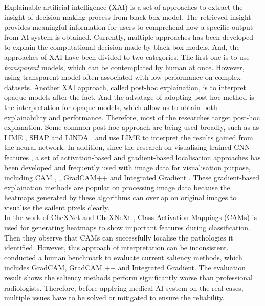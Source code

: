 Explainable artificial intelligence (XAI) is a set of approaches to extract the insight of decision making process from black-box model. The retrieved insight provides meaningful information for users to comprehend how a specific output from AI system is obtained. Currently, multiple approaches has been developed to explain the computational decision made by black-box models. And, the approaches of XAI have been divided to two categories. The first one is to use \textit{transparent} models, which can be contemplated by human at once. However, using transparent model often associated with low performance on complex datasets. Another XAI approach, called post-hoc explaination, is to interpret opaque models after-the-fact. And the advatage of adopting post-hoc method is the interpretation for opaque models, which allow us to obtain both explainability and performance. Therefore, most of the researches target post-hoc explanation. Some common post-hoc approach are being used broadly, such as as LIME \citep{Ribeiro2016LIME}, SHAP \citep{Lundberg2017SHAP} and LINDA \citep{Moreira2021LINDA}. \citet{Ahsan2020LIMEOnCXR} and \citet{Teixeira2021LIMEAndGradCAMOnCXR} use LIME to interpret the results gained from the neural network. In addition, since the research on visualising trained CNN features \citep{Zeiler2014UnderstandCNN} \citep{Simonyan14DeepInside}, a set of activation-based and gradient-based localisation approaches has been developed and frequently used with image data for visualisation purpose, including CAM \citep{Zhou2015CAM}, \citep{Selvaraju2017GradCAM}, GradCAM++ \citep{Chattopadhay2018GradCAM++} and Integrated Gradient \citep{Sundararajan2017IntegratedGradient}. These gradient-based explaination methods are popular on processing image data because the heatmaps generated by these algorithms can overlap on original images to visualise the sailent pixels clearly. \\


In the work of CheXNet \citep{Rajpurkar2017CheXNet} and CheXNeXt \citep{Rajpurkar2018CheXNeXt}, Class Activation Mappings (CAMs) \citep{Zhou2015CAM} is used for generating heatmaps to show important features during classification. Then they observe that CAMs can successfully localise the pathologies it identified. However, this approach of interpretation can be inconsistent. \citet{Saporta2021BechmarkingSaliencyMethods} conducted a human benchmark to evaluate current saliency methods, which includes GradCAM, GradCAM ++ and Integrated Gradient. The evaluation result shows the saliency methods perform significantly worse than professional radiologists. Therefore, before applying medical AI system on the real cases, multiple issues have to be solved or mitigated to ensure the reliability. \\

